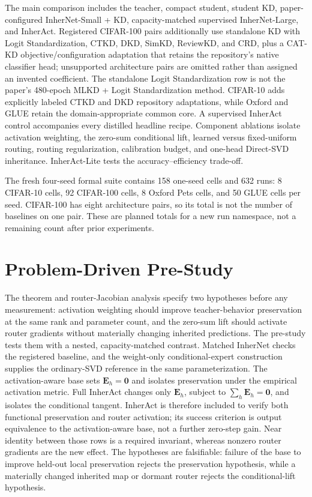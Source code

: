 \documentclass{article}
\newcommand{\bE}{\mathbf{E}}
\begin{document}
The main comparison includes the teacher, compact student, student KD,
paper-configured InherNet-Small + KD, capacity-matched supervised
InherNet-Large, and InherAct.  Registered CIFAR-100 pairs additionally use
standalone KD with Logit Standardization, CTKD, DKD, SimKD, ReviewKD, and CRD,
plus a CAT-KD objective/configuration adaptation that retains the repository's
native classifier head; unsupported architecture pairs are omitted rather than
assigned an invented coefficient.  The standalone Logit Standardization row is not the
paper's 480-epoch MLKD + Logit Standardization method.  CIFAR-10 adds explicitly
labeled CTKD and DKD repository adaptations, while Oxford and GLUE retain the
domain-appropriate common core.  A supervised InherAct control accompanies
every distilled headline recipe.  Component ablations isolate activation
weighting, the zero-sum conditional lift, learned versus fixed-uniform routing,
routing regularization, calibration budget, and one-head Direct-SVD
inheritance.  InherAct-Lite tests the accuracy--efficiency trade-off.

The fresh four-seed formal suite contains 158 one-seed cells and 632 runs:
8 CIFAR-10 cells, 92 CIFAR-100 cells, 8 Oxford Pets cells, and 50 GLUE cells
per seed.  CIFAR-100 has eight architecture pairs, so its total is not the
number of baselines on one pair.  These are planned totals for a new run
namespace, not a remaining count after prior experiments.

\section{Problem-Driven Pre-Study}

The theorem and router-Jacobian analysis specify two hypotheses before any
measurement: activation weighting should improve teacher-behavior preservation
at the same rank and parameter count, and the zero-sum lift should activate
router gradients without materially changing inherited predictions.  The
pre-study tests them with a nested, capacity-matched contrast.  Matched
InherNet checks the registered baseline, and the weight-only conditional-expert
construction supplies the ordinary-SVD reference in the same parameterization.
The activation-aware base sets $\bE_h=\mathbf{0}$ and isolates preservation
under the empirical activation metric.  Full InherAct changes only $\bE_h$,
subject to $\sum_h\bE_h=\mathbf{0}$, and isolates the conditional tangent.
InherAct is therefore included to verify both functional preservation and router
activation; its success criterion is output equivalence to the activation-aware
base, not a further zero-step gain.  Near identity between those rows is a
required invariant, whereas nonzero router gradients are the new effect.  The
hypotheses are falsifiable: failure of the base to improve held-out local
preservation rejects the preservation hypothesis, while a materially changed
inherited map or dormant router rejects the conditional-lift hypothesis.
\end{document}
